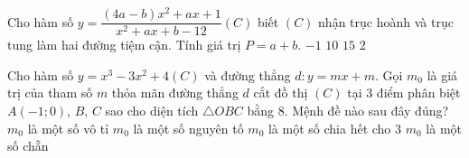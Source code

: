 \begin{ex}%
	Cho hàm số $y = \dfrac{{(4a - b){x^2} + ax + 1}}{{{x^2} + ax + b - 12}} (C)$ biết $(C)$ nhận trục hoành và trục tung làm hai đường tiệm cận. Tính giá trị $P=a+b.$ 
	\choice
	{$-1$}
	{$10$}
	{\True $15$}
	{$2$}
\end{ex}
\begin{ex}%
	Cho hàm số $y=x^3-3x^2+4 (C)$ và đường thẳng $d: y=mx+m$. Gọi $m_0$ là giá trị của tham số $m$ thỏa mãn đường thẳng $d$ cắt đồ thị $(C)$ tại $3$ điểm
	phân biệt $A(-1;0)$, $B$, $C$ sao cho diện tích $\triangle OBC$ bằng $8$. Mệnh đề nào sau đây đúng?
	\choice
	{\True $m_0$ là một số vô tỉ}
	{$m_0$ là một số nguyên tố}
	{$m_0$ là một số chia hết cho $3$}
	{$m_0$ là một số chẵn}
\end{ex}
